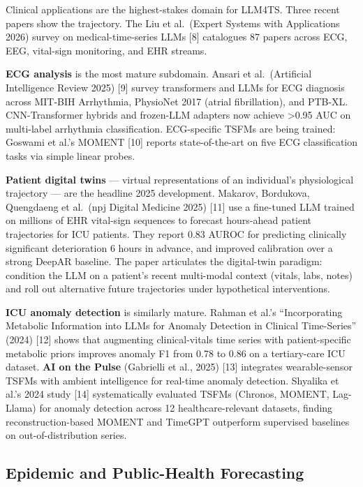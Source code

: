 Clinical applications are the highest-stakes domain for LLM4TS. Three recent papers show the trajectory. The Liu et al.~(Expert Systems with Applications 2026) survey on medical-time-series LLMs {[}8{]} catalogues 87 papers across ECG, EEG, vital-sign monitoring, and EHR streams.

\textbf{ECG analysis} is the most mature subdomain. Ansari et al.~(Artificial Intelligence Review 2025) {[}9{]} survey transformers and LLMs for ECG diagnosis across MIT-BIH Arrhythmia, PhysioNet 2017 (atrial fibrillation), and PTB-XL. CNN-Transformer hybrids and frozen-LLM adapters now achieve \textgreater0.95 AUC on multi-label arrhythmia classification. ECG-specific TSFMs are being trained: Goswami et al.'s MOMENT {[}10{]} reports state-of-the-art on five ECG classification tasks via simple linear probes.

\textbf{Patient digital twins} --- virtual representations of an individual's physiological trajectory --- are the headline 2025 development. Makarov, Bordukova, Quengdaeng et al.~(npj Digital Medicine 2025) {[}11{]} use a fine-tuned LLM trained on millions of EHR vital-sign sequences to forecast hours-ahead patient trajectories for ICU patients. They report 0.83 AUROC for predicting clinically significant deterioration 6 hours in advance, and improved calibration over a strong DeepAR baseline. The paper articulates the digital-twin paradigm: condition the LLM on a patient's recent multi-modal context (vitals, labs, notes) and roll out alternative future trajectories under hypothetical interventions.

\textbf{ICU anomaly detection} is similarly mature. Rahman et al.'s ``Incorporating Metabolic Information into LLMs for Anomaly Detection in Clinical Time-Series'' (2024) {[}12{]} shows that augmenting clinical-vitals time series with patient-specific metabolic priors improves anomaly F1 from 0.78 to 0.86 on a tertiary-care ICU dataset. \textbf{AI on the Pulse} (Gabrielli et al., 2025) {[}13{]} integrates wearable-sensor TSFMs with ambient intelligence for real-time anomaly detection. Shyalika et al.'s 2024 study {[}14{]} systematically evaluated TSFMs (Chronos, MOMENT, Lag-Llama) for anomaly detection across 12 healthcare-relevant datasets, finding reconstruction-based MOMENT and TimeGPT outperform supervised baselines on out-of-distribution series.

\subsection{Epidemic and Public-Health Forecasting}\label{epidemic-and-public-health-forecasting}

